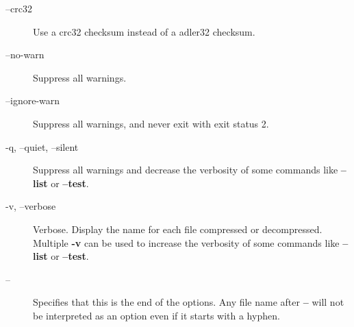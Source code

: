 \begin{description}
\item[--crc32] \mbox{}

Use a crc32 checksum instead of a adler32 checksum.


\item[--no-warn] \mbox{}

Suppress all warnings.


\item[--ignore-warn] \mbox{}

Suppress all warnings, and never exit with exit status 2.


\item[-q, --quiet, --silent] \mbox{}

Suppress all warnings and decrease the verbosity of some
commands like \textbf{--list} or \textbf{--test}.


\item[-v, --verbose] \mbox{}

Verbose. Display the name for each file compressed
or decompressed. Multiple \textbf{-v} can be used to increase
the verbosity of some commands like \textbf{--list} or \textbf{--test}.


\item[--] \mbox{}

Specifies that this is the end of the options. Any file name
after \textbf{--} will not be interpreted as an option even if
it starts with a hyphen.

\end{description}
